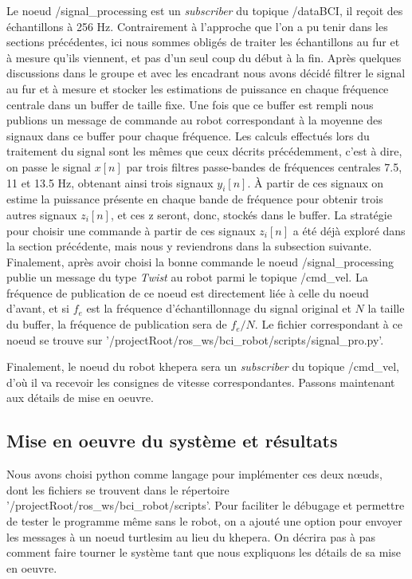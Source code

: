 Le noeud /signal\_processing est un \textit{subscriber} du topique /dataBCI, il reçoit des échantillons à 256 Hz. Contrairement à l'approche que l'on a pu tenir dans les sections précédentes, ici nous sommes obligés de traiter les échantillons au fur et à mesure qu'ils viennent, et pas d'un seul coup du début à la fin. Après quelques discussions dans le groupe et avec les encadrant nous avons décidé filtrer le signal au fur et à mesure et stocker les estimations de puissance en chaque fréquence centrale dans un buffer de taille fixe. Une fois que ce buffer est rempli nous publions un message de commande au robot correspondant à la moyenne des signaux dans ce buffer pour chaque fréquence. Les calculs effectués lors du traitement du signal sont les mêmes que ceux décrits précédemment, c'est à dire, on passe le signal \(x[n]\) par trois filtres passe-bandes de fréquences centrales 7.5, 11 et 13.5 Hz, obtenant ainsi trois signaux \(y_i[n]\). À partir de ces signaux on estime la puissance présente en chaque bande de fréquence pour obtenir trois autres signaux \(z_i[n]\), et ces z seront, donc, stockés dans le buffer. La stratégie pour choisir une commande à partir de ces signaux \(z_i[n]\) a été déjà exploré dans la section précédente, mais nous y reviendrons dans la subsection suivante. Finalement, après avoir choisi la bonne commande le noeud /signal\_processing publie un message du type \textit{Twist} au robot parmi le topique /cmd\_vel. La fréquence de publication de ce noeud est directement liée à celle du noeud d'avant, et si \(f_e\) est la fréquence d'échantillonnage du signal original et \(N\) la taille du buffer, la fréquence de publication sera de \(f_e/N\). Le fichier correspondant à ce noeud se trouve sur '/projectRoot/ros\_ws/bci\_robot/scripts/signal\_pro.py'.

Finalement, le noeud du robot khepera sera un \textit{subscriber} du topique /cmd\_vel, d'où il va recevoir les consignes de vitesse correspondantes. Passons maintenant aux détails de mise en oeuvre.

\subsection{Mise en oeuvre du système et résultats} \label{result}

Nous avons choisi python comme langage pour implémenter ces deux nœuds, dont les fichiers se trouvent dans le répertoire '/projectRoot/ros\_ws/bci\_robot/scripts'. Pour faciliter le débugage et permettre de tester le programme même sans le robot, on a ajouté une option pour envoyer les messages à un noeud turtlesim au lieu du khepera. On décrira pas à pas comment faire tourner le système tant que nous expliquons les détails de sa mise en oeuvre.

